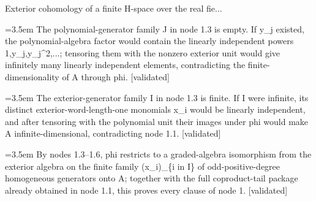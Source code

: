 \documentclass{article}
\newcommand{\step}[1]{\par\noindent\hangindent=3.5em\hangafter=1%
  \makebox[3.5em][l]{\textbf{#1.}}}
\newcommand{\steptag}[1]{\hfill{\small\textsf{[#1]}}}
\begin{document}
\begin{proofbox}{Exterior cohomology of a finite H-space over the real fie...}
\step{1.5} The polynomial-generator family J in node 1.3 is empty. If y\_j existed, the polynomial-algebra factor would contain the linearly independent powers 1,y\_j,y\_j\textasciicircum{}2,...; tensoring them with the nonzero exterior unit would give infinitely many linearly independent elements, contradicting the finite-dimensionality of A through phi. \steptag{validated} \\[4pt]
\step{1.6} The exterior-generator family I in node 1.3 is finite. If I were infinite, its distinct exterior-word-length-one monomials x\_i would be linearly independent, and after tensoring with the polynomial unit their images under phi would make A infinite-dimensional, contradicting node 1.1. \steptag{validated} \\[4pt]
\step{1.7} By nodes 1.3--1.6, phi restricts to a graded-algebra isomorphism from the exterior algebra on the finite family (x\_i)\_\{i in I\} of odd-positive-degree homogeneous generators onto A; together with the full coproduct-tail package already obtained in node 1.1, this proves every clause of node 1. \steptag{validated} \\[4pt]
\end{proofbox}
\end{document}
